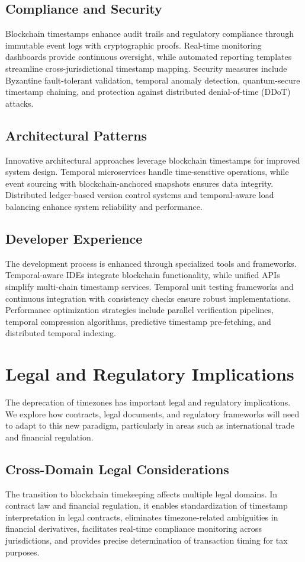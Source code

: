 \documentclass[12pt]{report}
\begin{document}
\subsection{Compliance and Security}
Blockchain timestamps enhance audit trails and regulatory compliance through immutable event logs with cryptographic proofs. Real-time monitoring dashboards provide continuous oversight, while automated reporting templates streamline cross-jurisdictional timestamp mapping. Security measures include Byzantine fault-tolerant validation, temporal anomaly detection, quantum-secure timestamp chaining, and protection against distributed denial-of-time (DDoT) attacks.

\subsection{Architectural Patterns}
Innovative architectural approaches leverage blockchain timestamps for improved system design. Temporal microservices handle time-sensitive operations, while event sourcing with blockchain-anchored snapshots ensures data integrity. Distributed ledger-based version control systems and temporal-aware load balancing enhance system reliability and performance.

\subsection{Developer Experience}
The development process is enhanced through specialized tools and frameworks. Temporal-aware IDEs integrate blockchain functionality, while unified APIs simplify multi-chain timestamp services. Temporal unit testing frameworks and continuous integration with consistency checks ensure robust implementations. Performance optimization strategies include parallel verification pipelines, temporal compression algorithms, predictive timestamp pre-fetching, and distributed temporal indexing.

\section{Legal and Regulatory Implications}
The deprecation of timezones has important legal and regulatory implications. We explore how contracts, legal documents, and regulatory frameworks will need to adapt to this new paradigm, particularly in areas such as international trade and financial regulation.

\subsection{Cross-Domain Legal Considerations}
The transition to blockchain timekeeping affects multiple legal domains. In contract law and financial regulation, it enables standardization of timestamp interpretation in legal contracts, eliminates timezone-related ambiguities in financial derivatives, facilitates real-time compliance monitoring across jurisdictions, and provides precise determination of transaction timing for tax purposes. 
\end{document}
